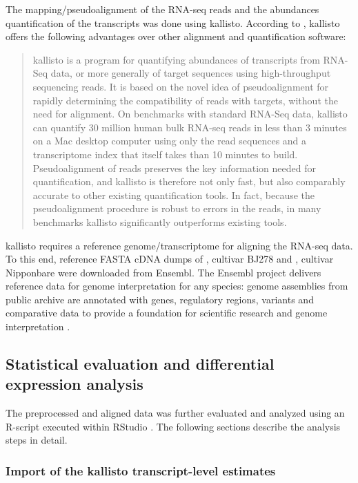 The mapping/pseudoalignment of the RNA-seq reads and the abundances quantification of the transcripts was done using kallisto. According to \autocite{10.1038/nbt.3519}, kallisto offers the following advantages over other alignment and quantification software:
\begin{quote}
    kallisto is a program for quantifying abundances of transcripts from RNA-Seq data, or more generally of target sequences using high-throughput sequencing reads. It is based on the novel idea of pseudoalignment for rapidly determining the compatibility of reads with targets, without the need for alignment. On benchmarks with standard RNA-Seq data, kallisto can quantify 30 million human bulk RNA-seq reads in less than 3 minutes on a Mac desktop computer using only the read sequences and a transcriptome index that itself takes than 10 minutes to build. Pseudoalignment of reads preserves the key information needed for quantification, and kallisto is therefore not only fast, but also comparably accurate to other existing quantification tools. In fact, because the pseudoalignment procedure is robust to errors in the reads, in many benchmarks kallisto significantly outperforms existing tools.
\end{quote}

kallisto requires a reference genome/transcriptome for aligning the RNA-seq data. To this end, reference FASTA cDNA dumps of , cultivar BJ278 and , cultivar Nipponbare were downloaded from Ensembl. The Ensembl project delivers reference data for genome interpretation for any species: genome assemblies from public archive are annotated with genes, regulatory regions, variants and comparative data to provide a foundation for scientific research and genome interpretation \autocite{10.1093/nar/gkab1049}.


\subsection{Statistical evaluation and differential expression analysis}

The preprocessed and aligned data was further evaluated and analyzed using an R-script \autocite{R-base} executed within RStudio \autocite{RStudio}. The following sections describe the analysis steps in detail.

\subsubsection{Import of the kallisto transcript-level estimates}

